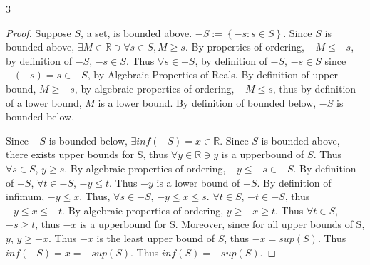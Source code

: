 \documentclass{article}
\newcommand{\R}{\mathbb{R}}
\begin{document}
\bigskip

\begin{PROB}{3}\label{Problem 3.}
\end{PROB}
\begin{proof}
    Suppose $S$, a set, is bounded above. $-S := \left\{ -s : s \in S \right\}$. Since $S$ is bounded above, $\exists M \in \R \ni \forall s \in S, M \geq s$. By properties of ordering, $-M \leq -s$, by definition of $-S$, $-s \in S$. Thus $\forall s \in -S$, by definition of $-S$, $-s \in S$ since $-(-s) = s \in -S$, by Algebraic Properties of Reals. By definition of upper bound, $M \geq -s$, by algebraic properties of ordering, $-M \leq s$, thus by definition of a lower bound, $M$ is a lower bound. By definition of bounded below, $-S$ is bounded below. 
    
    Since $-S$ is bounded below, $\exists inf(-S) = x \in \R$. Since $S$ is bounded above, there exists upper bounds for S, thus $\forall y \in \R \ni y $ is a upperbound of $S$. Thus $\forall s \in S$, $y \geq s$. By algebraic properties of ordering, $-y \leq -s \in -S$. By definition of $-S$, $\forall t \in -S$, $-y \leq t$. Thus $-y$ is a lower bound of $-S$. By definition of infimum, $-y \leq x$. Thus, $\forall s \in -S$, $-y \leq x \leq s$. $\forall t \in S$, $-t \in -S$, thus $-y \leq x \leq -t$. By algebraic properties of ordering, $y \geq -x \geq t$. Thus $\forall t \in S$, $-s \geq t$, thus $-x$ is a upperbound for S. Moreover, since for all upper bounds of S, $y$, $y \geq -x$. Thus $-x$ is the least upper bound of $S$, thus $-x = sup(S)$. Thus $inf(-S) = x = -sup(S)$. Thus $inf(S) = -sup(S)$.                   
\end{proof}

\bigskip
\end{document}
